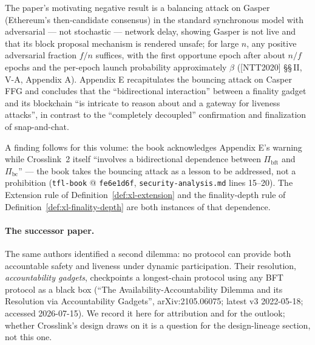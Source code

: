 \documentclass[11pt,a4paper]{article}
\theoremstyle{definition}
\begin{document}
The paper's motivating negative result is a balancing attack on Gasper
(Ethereum's then-candidate consensus) in the standard synchronous model
with adversarial --- not stochastic --- network delay, showing Gasper is
not live and that its block proposal mechanism is rendered unsafe; for
large $n$, any positive adversarial fraction $f/n$ suffices, with the
first opportune epoch after about $n/f$ epochs and the per-epoch launch
probability approximately $\beta$ ([NTT2020] \S\S\,II, V-A, Appendix A).
Appendix E recapitulates the bouncing attack on Casper FFG and concludes
that the ``bidirectional interaction'' between a finality gadget and its
blockchain ``is intricate to reason about and a gateway for liveness
attacks'', in contrast to the ``completely decoupled'' confirmation and
finalization of snap-and-chat.

A finding follows for this volume: the book acknowledges Appendix E's
warning while Crosslink~2 itself ``involves a bidirectional dependence
between $\Pi_{\mathrm{bft}}$ and $\Pi_{\mathrm{bc}}$'' --- the book takes
the bouncing attack as a lesson to be addressed, not a prohibition
(\texttt{tfl-book} @ \texttt{fe6e1d6f}, \texttt{security-analysis.md}
lines 15--20). The Extension rule of Definition~\ref{def:xl-extension} and
the finality-depth rule of Definition~\ref{def:xl-finality-depth} are both
instances of that dependence.

\paragraph{The successor paper.} The same authors identified a second
dilemma: no protocol can provide both accountable safety and liveness
under dynamic participation. Their resolution, \emph{accountability
gadgets}, checkpoints a longest-chain protocol using any BFT protocol as
a black box (``The Availability-Accountability Dilemma and its Resolution
via Accountability Gadgets'', arXiv:2105.06075; latest v3 2022-05-18;
accessed 2026-07-15). We record it here for attribution and for the
outlook; whether Crosslink's design draws on it is a question for the
design-lineage section, not this one.
\end{document}
